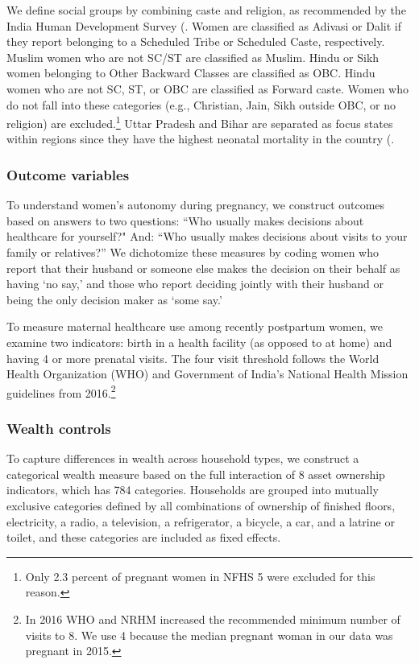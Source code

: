 \documentclass[10pt,twoside,reqno]{article}
\begin{document}
We define social groups by combining caste and religion, as recommended by the India Human Development Survey (\cite{desai2008india}. Women are classified as Adivasi or Dalit if they report belonging to a Scheduled Tribe or Scheduled Caste, respectively. Muslim women who are not SC/ST are classified as Muslim. Hindu or Sikh women belonging to Other Backward Classes are classified as OBC. Hindu women who are not SC, ST, or OBC are classified as Forward caste. Women who do not fall into these categories (e.g., Christian, Jain, Sikh outside OBC, or no religion) are excluded.\footnote{Only 2.3 percent of pregnant women in NFHS 5 were excluded for this reason.} Uttar Pradesh and Bihar are separated as focus states within regions since they have the highest neonatal mortality in the country (\cite{coffey2025excess}. 

\subsubsection{Outcome variables} \label{sec:outcomes}
To understand women's autonomy during pregnancy, we construct outcomes based on answers to two questions: ``Who usually makes decisions about healthcare for yourself?"  And: ``Who usually makes decisions about visits to your family or relatives?'' We dichotomize these measures by coding women who report that their husband or someone else makes the decision on their behalf as having ‘no say,’ and those who report deciding jointly with their husband or being the only decision maker as ‘some say.’

To measure maternal healthcare use among recently postpartum women, we examine two indicators: birth in a health facility (as opposed to at home) and having 4 or more prenatal visits. The four visit threshold follows the World Health Organization (WHO) and Government of India’s National Health Mission guidelines from 2016.\footnote{In 2016 WHO and NRHM increased the recommended minimum number of visits to 8.  We use 4 because the median pregnant woman in our data was pregnant in 2015.}

\subsubsection{Wealth controls} \label{sec:wealthcontrols}

To capture differences in wealth across household types, we construct a categorical wealth measure based on the full interaction of 8 asset ownership indicators, which has 784 categories. Households are grouped into mutually exclusive categories defined by all combinations of ownership of finished floors, electricity, a radio, a television, a refrigerator, a bicycle, a car, and a latrine or toilet, and these categories are included as fixed effects.
\end{document}
